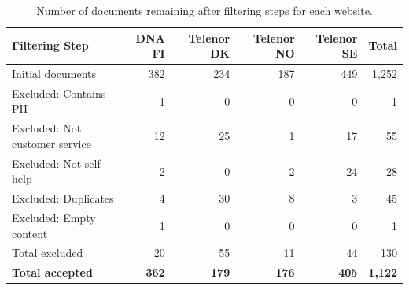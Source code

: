 \begin{table}[t]
\centering
\caption{Number of documents remaining after filtering steps for each website.}
\begin{tabular}{lrrrrr}
\toprule
\textbf{Filtering Step} & \textbf{DNA FI} & \textbf{Telenor DK} & \textbf{Telenor NO} & \textbf{Telenor SE} & \textbf{Total} \\
\midrule
Initial documents & 382 & 234 & 187 & 449 & 1{,}252 \\
Excluded: Contains PII & 1 & 0 & 0 & 0 & 1 \\
Excluded: Not customer service & 12 & 25 & 1 & 17 & 55 \\
Excluded: Not self help & 2 & 0 & 2 & 24 & 28 \\
Excluded: Duplicates & 4 & 30 & 8 & 3 & 45 \\
Excluded: Empty content & 1 & 0 & 0 & 0 & 1 \\
\midrule
Total excluded & 20 & 55 & 11 & 44 & 130 \\
\textbf{Total accepted} & \textbf{362} & \textbf{179} & \textbf{176} & \textbf{405} & \textbf{1{,}122} \\
\bottomrule
\end{tabular}
\label{tab:filtering_summary}
\end{table}
